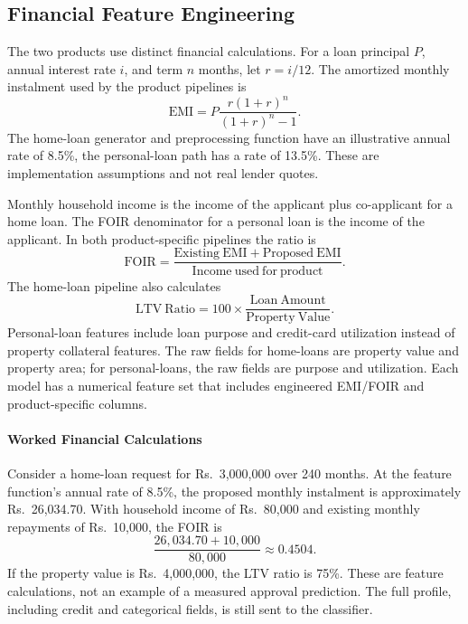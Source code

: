 \subsection{Financial Feature Engineering}
The two products use distinct financial calculations. For a loan principal $P$, annual interest rate $i$, and term $n$ months, let $r=i/12$. The amortized monthly instalment used by the product pipelines is
\begin{equation}
  \mathrm{EMI}=P\frac{r(1+r)^n}{(1+r)^n-1}.
  \label{eq:emi}
\end{equation}
The home-loan generator and preprocessing function have an illustrative annual rate of 8.5\%, the personal-loan path has a rate of 13.5\%. These are implementation assumptions and not real lender quotes.

Monthly household income is the income of the applicant plus co-applicant for a home loan. The FOIR denominator for a personal loan is the income of the applicant. In both product-specific pipelines the ratio is
\begin{equation}
  \mathrm{FOIR}=\frac{\mathrm{Existing\ EMI}+\mathrm{Proposed\ EMI}}{\mathrm{Income\ used\ for\ product}}.
  \label{eq:foir}
\end{equation}
The home-loan pipeline also calculates
\begin{equation}
  \mathrm{LTV\ Ratio}=100\times\frac{\mathrm{Loan\ Amount}}{\mathrm{Property\ Value}}.
  \label{eq:ltv}
\end{equation}
Personal-loan features include loan purpose and credit-card utilization instead of property collateral features. The raw fields for home-loans are property value and property area; for personal-loans, the raw fields are purpose and utilization. Each model has a numerical feature set that includes engineered EMI/FOIR and product-specific columns.

\paragraph*{Worked Financial Calculations}
Consider a home-loan request for Rs.~3,000,000 over 240 months. At the feature function's annual rate of 8.5\%, the proposed monthly instalment is approximately Rs.~26,034.70. With household income of Rs.~80,000 and existing monthly repayments of Rs.~10,000, the FOIR is
\[
\frac{26,034.70+10,000}{80,000}\approx 0.4504.
\]
If the property value is Rs.~4,000,000, the LTV ratio is 75\%. These are feature calculations, not an example of a measured approval prediction. The full profile, including credit and categorical fields, is still sent to the classifier.

